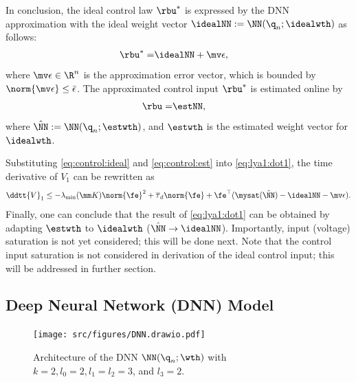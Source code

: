 \documentclass[lettersize,journal]{IEEEtran}
\begin{document}
In conclusion, the ideal control law $\rbu^*$ is expressed by the DNN approximation with the ideal weight vector $\idealNN:=\NN({\q}_n;\idealwth)$ as follows:
\begin{align}
    \rbu^*=& \idealNN+\mv\epsilon
    ,
    \label{eq:control:ideal}
\end{align}
where $\mv\epsilon\in\R^n$ is the approximation error vector, which is bounded by $\norm{\mv\epsilon}\le \bar{\epsilon}$.
The approximated control input $\rbu^*$ is estimated online by
\begin{align}
    \rbu =& \estNN,
    \label{eq:control:est}
\end{align}
where $\hat\NN:=\NN({\q}_n;\estwth)$, and  $\estwth$ is the estimated weight vector for $\idealwth$.

Substituting \eqref{eq:control:ideal} and \eqref{eq:control:est} into \eqref{eq:lya1:dot1}, the time derivative of $V_1$ can be rewritten as
\begin{equation}
    \ddtt{V}_1
    \le 
    -\lambda_{\min}(\mm K)\norm{\fe}^2
    +
    \overline\tau_d\norm{\fe}
    +
    \fe^\top (\mysat(\hat\NN)-\idealNN-\mv\epsilon)
    .
    \label{eq:lya1:dot2}
\end{equation}
Finally, one can conclude that the result of \eqref{eq:lya1:dot1} can be obtained by adapting $\estwth$ to $\idealwth$ (\ie $\hat\NN\to\idealNN$).
Importantly, input (voltage) saturation
is not yet considered; this will be done next.
Note that the control input saturation is not considered in derivation of the ideal control input; this will be addressed in further section.

\subsection{Deep Neural Network (DNN) Model}\label{sec:sub:NN definition}

\begin{figure}[t]
    \centering
    \texttt{[image: src/figures/DNN.drawio.pdf]}
    \caption{
        Architecture of the DNN $\NN({\q}_n;\wth)$ with $k=2,l_0=2,l_1=l_2=3$, and $l_3=2$.
    }
    \label{fig:DNN}
\end{figure}
\end{document}

